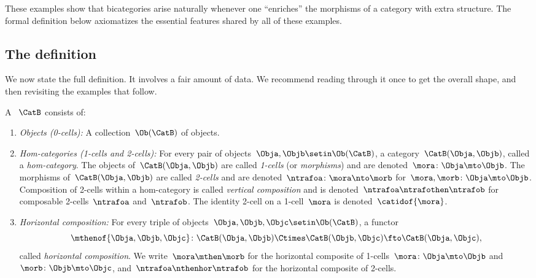 These examples show that bicategories arise naturally whenever one ``enriches'' the morphisms of a category with extra structure.
The formal definition below axiomatizes the essential features shared by all of these examples.

\subsection{The definition}

We now state the full definition. It involves a fair amount of data. We recommend reading through it once to get the overall shape, and then revisiting the examples that follow.

\begin{ctdefinition}[Bicategory]
    \label{def:bicategory}
    A ~$\CatB$ consists of:

    \constit

    \begin{enumerate}
        \item \label{bicat-objects}
              \emph{Objects (0-cells):}
              A collection~$\Ob(\CatB)$ of objects.

        \item \label{bicat-hom-cats}
              \emph{Hom-categories (1-cells and 2-cells):}
              For every pair of objects~$\Obja, \Objb \setin \Ob(\CatB)$, a category~$\CatB(\Obja, \Objb)$, called a \emph{hom-category}.
              The objects of~$\CatB(\Obja, \Objb)$ are called \emph{1-cells} (or \emph{morphisms}) and are denoted~$\mora \colon \Obja \mto \Objb$.
              The morphisms of~$\CatB(\Obja, \Objb)$ are called \emph{2-cells} and are denoted~$\ntrafoa \colon \mora \nto \morb$ for~$\mora, \morb \colon \Obja \mto \Objb$.
              Composition of 2-cells within a hom-category is called \emph{vertical composition} and is denoted~$\ntrafoa \ntrafothen \ntrafob$ for composable 2-cells~$\ntrafoa$ and~$\ntrafob$.
              The identity 2-cell on a 1-cell~$\mora$ is denoted~$\catidof{\mora}$.

        \item \label{bicat-horizontal-comp}
              \emph{Horizontal composition:}
              For every triple of objects~$\Obja, \Objb, \Objc \setin \Ob(\CatB)$, a functor
              \begin{equation}\label{eq:bicat-horiz-comp}
                  \mthenof{\Obja,\Objb,\Objc} \colon \CatB(\Obja, \Objb) \Ctimes \CatB(\Objb, \Objc) \fto \CatB(\Obja, \Objc),
              \end{equation}
              called \emph{horizontal composition}.
              We write~$\mora \mthen \morb$ for the horizontal composite of 1-cells~$\mora\colon \Obja \mto \Objb$ and~$\morb\colon \Objb \mto \Objc$, and~$\ntrafoa \nthenhor \ntrafob$ for the horizontal composite of 2-cells.


\end{enumerate}
\end{ctdefinition}
